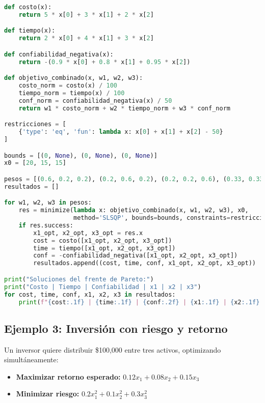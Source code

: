 \documentclass[12pt]{article}
\begin{document}
\begin{lstlisting}[language=Python]
def costo(x):
    return 5 * x[0] + 3 * x[1] + 2 * x[2]

def tiempo(x):
    return 2 * x[0] + 4 * x[1] + 3 * x[2]

def confiabilidad_negativa(x):
    return -(0.9 * x[0] + 0.8 * x[1] + 0.95 * x[2])

def objetivo_combinado(x, w1, w2, w3):
    costo_norm = costo(x) / 100
    tiempo_norm = tiempo(x) / 100
    conf_norm = confiabilidad_negativa(x) / 50
    return w1 * costo_norm + w2 * tiempo_norm + w3 * conf_norm

restricciones = [
    {'type': 'eq', 'fun': lambda x: x[0] + x[1] + x[2] - 50}
]

bounds = [(0, None), (0, None), (0, None)]
x0 = [20, 15, 15]

pesos = [(0.6, 0.2, 0.2), (0.2, 0.6, 0.2), (0.2, 0.2, 0.6), (0.33, 0.33, 0.34)]
resultados = []

for w1, w2, w3 in pesos:
    res = minimize(lambda x: objetivo_combinado(x, w1, w2, w3), x0,
                   method='SLSQP', bounds=bounds, constraints=restricciones)
    if res.success:
        x1_opt, x2_opt, x3_opt = res.x
        cost = costo([x1_opt, x2_opt, x3_opt])
        time = tiempo([x1_opt, x2_opt, x3_opt])
        conf = -confiabilidad_negativa([x1_opt, x2_opt, x3_opt])
        resultados.append((cost, time, conf, x1_opt, x2_opt, x3_opt))

print("Soluciones del frente de Pareto:")
print("Costo | Tiempo | Confiabilidad | x1 | x2 | x3")
for cost, time, conf, x1, x2, x3 in resultados:
    print(f"{cost:.1f} | {time:.1f} | {conf:.2f} | {x1:.1f} | {x2:.1f} | {x3:.1f}")
\end{lstlisting}

\subsection{Ejemplo 3: Inversión con riesgo y retorno}

Un inversor quiere distribuir \$100,000 entre tres activos, optimizando simultáneamente:

\begin{itemize}
    \item \textbf{Maximizar retorno esperado:} $0.12x_1 + 0.08x_2 + 0.15x_3$
    \item \textbf{Minimizar riesgo:} $0.2x_1^2 + 0.1x_2^2 + 0.3x_3^2$
\end{itemize}
\end{document}
